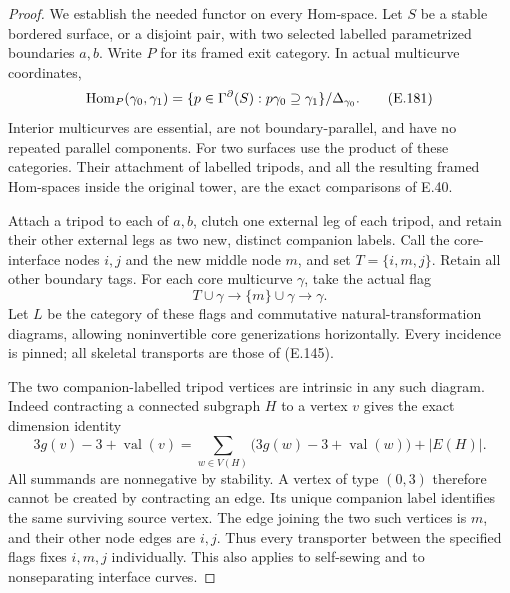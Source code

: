 \begin{proof}
We establish the needed functor on every Hom-space.  Let $S$
be a stable bordered surface, or a disjoint pair, with two
selected labelled parametrized boundaries $a,b$.  Write $P$
for its framed exit category.  In actual multicurve coordinates,
\[
 \operatorname{Hom}_P(\gamma_0,\gamma_1)=
 \{p\in\Gamma^{\partial}(S):p\gamma_0\supseteq\gamma_1\}
                                      /\Delta_{\gamma_0}.
                                                               \tag{E.181}
\]
Interior multicurves are essential, are not boundary-parallel,
and have no repeated parallel components.  For two surfaces use
the product of these categories.  Their attachment of labelled
tripods, and all the resulting framed Hom-spaces inside the
original tower, are the exact comparisons of E.40.

Attach a tripod to each of $a,b$, clutch one external leg of
each tripod, and retain their other external legs as two new,
distinct companion labels.  Call the core-interface nodes $i,j$
and the new middle node $m$, and set $T=\{i,m,j\}$.  Retain
all other boundary tags.  For each core multicurve $\gamma$,
take the actual flag
\[
 T\cup\gamma\longrightarrow\{m\}\cup\gamma
                                  \longrightarrow\gamma.
                                                               \tag{E.182}
\]
Let $L$ be the category of these flags and commutative
natural-transformation diagrams, allowing noninvertible core
generizations horizontally.  Every incidence is pinned; all
skeletal transports are those of (E.145).

The two companion-labelled tripod vertices are intrinsic in
any such diagram.  Indeed contracting a connected subgraph
$H$ to a vertex $v$ gives the exact dimension identity
\[
 3g(v)-3+\operatorname{val}(v)
  =\sum_{w\in V(H)}
       \bigl(3g(w)-3+\operatorname{val}(w)\bigr)
                        +|E(H)|.                            \tag{E.183}
\]
All summands are nonnegative by stability.  A vertex of type
$(0,3)$ therefore cannot be created by contracting an edge.
Its unique companion label identifies the same surviving
source vertex.  The edge joining the two such vertices is
$m$, and their other node edges are $i,j$.  Thus every
transporter between the specified flags fixes $i,m,j$
individually.  This also applies to self-sewing and to
nonseparating interface curves.


\end{proof}
